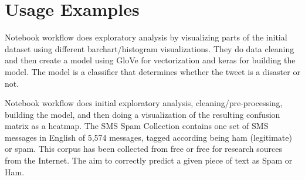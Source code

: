 \section{Usage Examples}\label{sec:usage}

 Notebook workflow does exploratory analysis by visualizing parts of the initial dataset using different barchart/histogram visualizations. They do data cleaning and then create a model using GloVe for vectorization and keras for building the model. The model is a classifier that determines whether the tweet is a disaster or not.

 Notebook workflow does initial exploratory analysis, cleaning/pre-processing, building the model, and then doing a visualization of the resulting confusion matrix as a heatmap. The SMS Spam Collection contains one set of SMS messages in English of 5,574 messages, tagged according being ham (legitimate) or spam. This corpus has been collected from free or free for research sources from the Internet. The aim to correctly predict a given piece of text as Spam or Ham.



